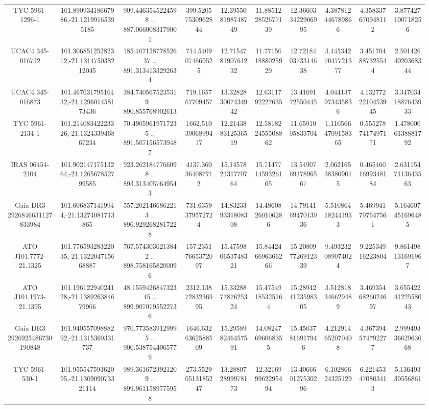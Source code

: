 \begin{table}
\begin{tabular}{cccccccccc}
TYC 5961-1296-1 & 101.89093418667986,-21.12199165395185 & 909.4463545224598 .. 887.0660083179001 & 399.52057530962844 & 12.395508198748749 & 11.885122852677139 & 12.366033422906995 & 4.387812446789866 & 4.358337670948112 & 3.877427100718256 \\
UCAC4 345-016712 & 101.30685125282312,-21.131475038212045 & 185.46715877852637 .. 891.3134133292634 & 714.5409074669525 & 12.715478190761232 & 11.771561888025929 & 12.721840373314638 & 3.4453427047721377 & 3.451704887325544 & 2.5014264020368344 \\
UCAC4 345-016873 & 101.46763179516432,-21.129601458173436 & 384.7405675235319 .. 890.855768902613 & 719.165767709457 & 13.328283007434942 & 12.6311792227635 & 13.4169172550445 & 4.044137973435836 & 4.1327722210453945 & 3.3470341887643933 \\
TYC 5961-2134-1 & 101.21408342223326,-21.132433946867234 & 70.49059619717235 .. 891.5071565739487 & 1662.5103906899417 & 12.214388312536519 & 12.581822455508862 & 11.6591005833704 & 1.1105664709158365 & 0.5552787417497171 & 1.4780006138881792 \\
IRAS 06454-2104 & 101.90214717513264,-21.126567852799585 & 923.2621847766098 .. 893.3134057649543 & 4137.360364087712 & 15.145782131770764 & 15.714771459326105 & 13.549076917896567 & 2.062165383809015 & 0.4654601699348184 & 2.6311547113643563 \\
Gaia DR3 2926846631127833984 & 101.6068371419944,-21.13274081713865 & 557.2021466862213 .. 896.9292682817228 & 731.6359379572724 & 14.832339331808308 & 14.48608260106286 & 14.791416947013936 & 5.510864182441933 & 5.469941797647561 & 5.164607451696485 \\
ATO J101.7772-21.1325 & 101.77659328322035,-21.132204715668887 & 767.5743036213842 .. 898.7581658200096 & 157.23517665372097 & 15.475980653748321 & 15.844246696366266 & 15.208097726912339 & 9.493232089074024 & 9.22534916223804 & 9.861498131691967 \\
ATO J101.1973-21.1395 & 101.19612294024128,-21.138926384679966 & 48.155942684732345 .. 899.9070795522736 & 2312.1387283236995 & 15.332887787625324 & 15.47549185325164 & 15.289424123598305 & 3.512818346629489 & 3.4693546826024697 & 3.6554224122558043 \\
Gaia DR3 2926925486730190848 & 101.94055709888292,-21.1315369331737 & 970.7735839129995 .. 900.5387544065779 & 1646.6326362588509 & 15.295898246457591 & 14.08247696068355 & 15.45037816917946 & 4.212914652070408 & 4.367394574792277 & 2.9994933662963668 \\
TYC 5961-530-1 & 101.95554759362095,-21.130909073321114 & 989.3616723921209 .. 899.9611589775958 & 273.55290513185247 & 13.288072899978173 & 12.321699962295494 & 13.406660127530296 & 6.10286624325129 & 6.221453470803413 & 5.13649330556861 \\

\end{tabular}
\end{table}
